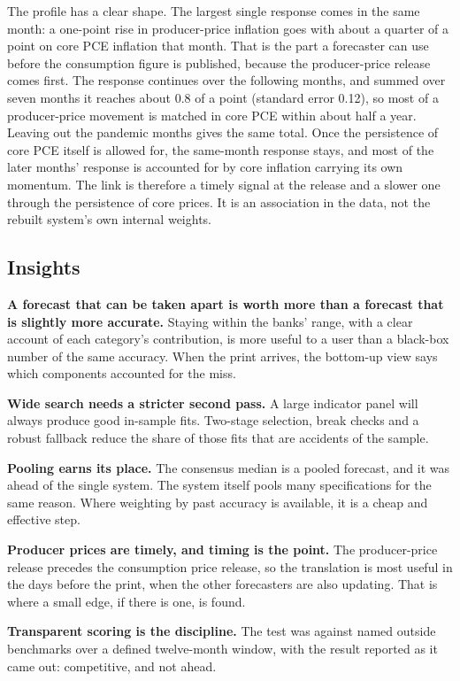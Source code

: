 \documentclass[
  british,
  a4paper,
]{article}
\begin{document}
The profile has a clear shape. The largest single response comes in the
same month: a one-point rise in producer-price inflation goes with about
a quarter of a point on core PCE inflation that month. That is the part
a forecaster can use before the consumption figure is published, because
the producer-price release comes first. The response continues over the
following months, and summed over seven months it reaches about 0.8 of a
point (standard error 0.12), so most of a producer-price movement is
matched in core PCE within about half a year. Leaving out the pandemic
months gives the same total. Once the persistence of core PCE itself is
allowed for, the same-month response stays, and most of the later
months' response is accounted for by core inflation carrying its own
momentum. The link is therefore a timely signal at the release and a
slower one through the persistence of core prices. It is an association
in the data, not the rebuilt system's own internal weights.

\subsection{Insights}\label{insights}

\textbf{A forecast that can be taken apart is worth more than a forecast
that is slightly more accurate.} Staying within the banks' range, with a
clear account of each category's contribution, is more useful to a user
than a black-box number of the same accuracy. When the print arrives,
the bottom-up view says which components accounted for the miss.

\textbf{Wide search needs a stricter second pass.} A large indicator
panel will always produce good in-sample fits. Two-stage selection,
break checks and a robust fallback reduce the share of those fits that
are accidents of the sample.

\textbf{Pooling earns its place.} The consensus median is a pooled
forecast, and it was ahead of the single system. The system itself pools
many specifications for the same reason. Where weighting by past
accuracy is available, it is a cheap and effective step.

\textbf{Producer prices are timely, and timing is the point.} The
producer-price release precedes the consumption price release, so the
translation is most useful in the days before the print, when the other
forecasters are also updating. That is where a small edge, if there is
one, is found.

\textbf{Transparent scoring is the discipline.} The test was against
named outside benchmarks over a defined twelve-month window, with the
result reported as it came out: competitive, and not ahead.
\end{document}
